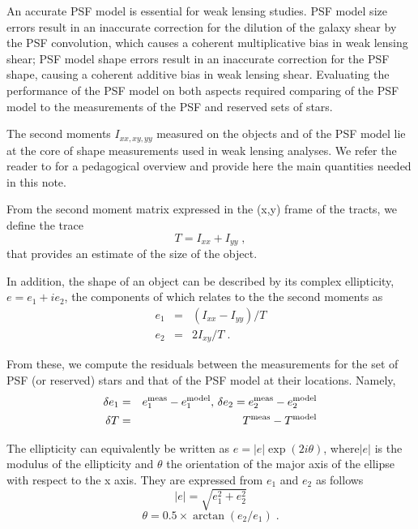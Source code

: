 \documentclass[SE,lsstdraft,authoryear,toc]{lsstdoc}
\begin{document}
An accurate PSF model is essential for weak lensing studies. PSF model size errors result in an inaccurate correction for the dilution of the galaxy shear by the PSF convolution, which causes a coherent multiplicative bias in weak lensing shear; PSF model shape errors result in an inaccurate correction for the PSF shape, causing a coherent additive bias in weak lensing shear. Evaluating the performance of the PSF model on both aspects required comparing of the PSF model to the measurements of the PSF and reserved sets of stars.

The second moments $I_{xx,xy,yy}$ measured on the objects and of the PSF model lie at the core of shape measurements used in weak lensing analyses. We refer the reader to \citet{2014ApJS..212....5M} for a pedagogical overview and provide here the main quantities needed in this note.   

From the second moment matrix expressed in the (x,y) frame of the tracts, we define the trace 
\begin{equation}
T = I_{xx} + I_{yy}\;,
\end{equation}
that provides an estimate of the size of the object.

In addition, the shape of an object can be described by its complex ellipticity, $e=e_1+i e_2$, the components of which relates to the the second moments as
\begin{eqnarray}
  e_1 &=& (I_{xx} - I_{yy})/T \\
  e_2 &=& 2 I_{xy} / T\;.
\end{eqnarray}

From these, we compute the residuals between the measurements for the set of PSF (or reserved) stars and that of the PSF model at their locations.  Namely,
\begin{eqnarray}
\delta e_1 &=& e_1^{\rm meas} - e_1^{\rm model}, \, \delta e_2 = e_2^{\rm meas} - e_2^{\rm model}\\
\delta T &=& T^{\rm meas} - T^{\rm model} 
\end{eqnarray}

The ellipticity can equivalently be written as $e = |e| \exp(2i\theta)$, where$|e|$ is the modulus of the ellipticity and $\theta$ the orientation of the major axis of the ellipse with respect to the x axis. They are expressed from $e_1$ and $e_2$ as follows
\begin{equation} 
|e| = \sqrt{e_1^2 + e_2^2}
\label{eq:modulus}
\end{equation}
\begin{equation}
\theta = 0.5 \times \arctan(e_2/e_1)\;.
\label{eq:theta}
\end{equation}
\end{document}
